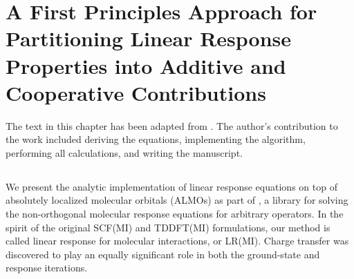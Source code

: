 \documentclass[%
  class = book,%
  crop = false,%
  float = true,%
  multi = true,%
  preview = false,%
]{standalone}
\begin{document}
\newcommand{\geomdeftsvp}{\SI{2.4106}{\angstrom}}
\newcommand{\geomdeftsvpd}{\SI{2.4297}{\angstrom}}
\chapter[ALMO Linear Response]{A First Principles Approach for Partitioning Linear Response Properties into Additive and Cooperative Contributions}
\label{ch:paper_04}

The text in this chapter has been adapted from . The author's contribution to the work included deriving the equations, implementing the algorithm, performing all calculations, and writing the manuscript.

\section{\texorpdfstring{}{Summary}}

We present the analytic implementation of linear response equations on top of absolutely localized molecular orbitals (ALMOs) as part of \libresponse{}, a library for solving the non-orthogonal molecular response equations for arbitrary operators. In the spirit of the original SCF(MI) and TDDFT(MI) formulations, our method is called linear response for molecular interactions, or LR(MI). Charge transfer was discovered to play an equally significant role in both the ground-state and response iterations.

\section{\texorpdfstring{}{Introduction}}
\label{sec:introduction}
\end{document}
